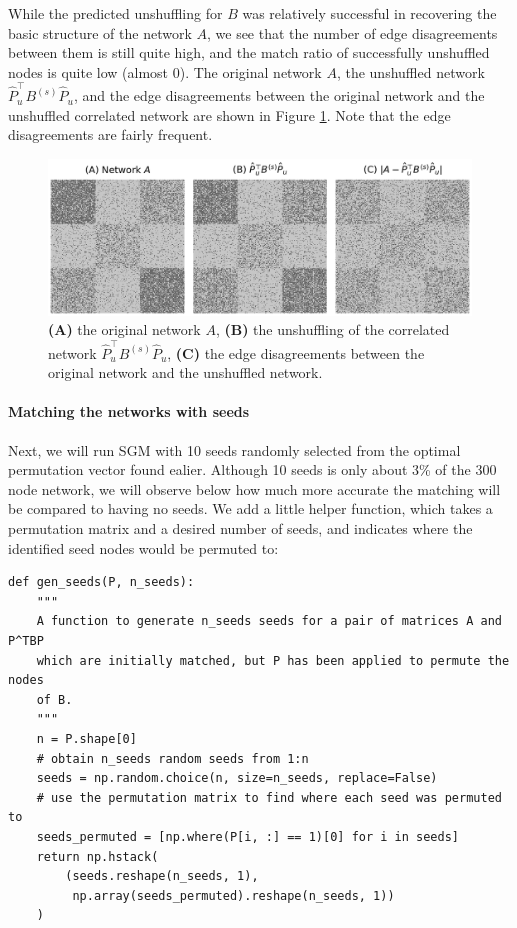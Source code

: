 While the predicted unshuffling for $B$ was relatively successful in recovering the basic structure of the network $A$, we see that the number of edge disagreements between them is still quite high, and the match ratio of successfully unshuffled nodes is quite low (almost $0$). The original network $A$, the unshuffled network $\hat P_u^\top B^{(s)}\hat P_u$, and the edge disagreements between the original network and the unshuffled correlated network are shown in Figure \ref{fig:ch8:gm:sgm:noseed}. Note that the edge disagreements are fairly frequent.

\begin{figure}[h]
    \centering
    \includegraphics[width=\linewidth]{applications/ch8/Images/gm_sgm_noseed.png}
    \caption[Graph matching with no seeds]{\textbf{(A)} the original network $A$, \textbf{(B)} the unshuffling of the correlated network $\hat P_u^\top B^{(s)}\hat P_u$, \textbf{(C)} the edge disagreements between the original network and the unshuffled network.}
    \label{fig:ch8:gm:sgm:noseed}
\end{figure}

\paragraph*{Matching the networks with seeds}

Next, we will run SGM with 10 seeds randomly selected from the optimal permutation vector found ealier. Although 10 seeds is only about 3\% of the 300 node network, we will observe below how much more accurate the matching will be compared to having no seeds. We add a little helper function, which takes a permutation matrix and a desired number of seeds, and indicates where the identified seed nodes would be permuted to:

\begin{lstlisting}[style=python]
def gen_seeds(P, n_seeds):
    """
    A function to generate n_seeds seeds for a pair of matrices A and P^TBP
    which are initially matched, but P has been applied to permute the nodes
    of B.
    """
    n = P.shape[0]
    # obtain n_seeds random seeds from 1:n
    seeds = np.random.choice(n, size=n_seeds, replace=False)
    # use the permutation matrix to find where each seed was permuted to
    seeds_permuted = [np.where(P[i, :] == 1)[0] for i in seeds]
    return np.hstack(
        (seeds.reshape(n_seeds, 1), 
         np.array(seeds_permuted).reshape(n_seeds, 1))
    )
\end{lstlisting}

